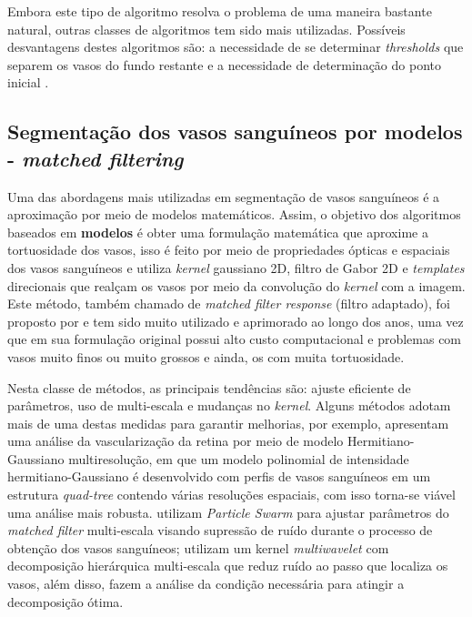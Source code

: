 Embora este tipo de algoritmo resolva o problema de uma maneira bastante natural, outras classes de algoritmos tem sido mais utilizadas. Possíveis desvantagens destes algoritmos são: a necessidade de se determinar \textit{thresholds} que separem os vasos do fundo restante e a necessidade de determinação do ponto inicial \cite{Wang2007}.


\subsection{Segmentação dos vasos sanguíneos por modelos - \textit{matched filtering}}


Uma das abordagens mais utilizadas em segmentação de vasos sanguíneos é a aproximação por meio de modelos matemáticos. Assim, o objetivo dos algoritmos baseados em \textbf{modelos} é obter uma formulação matemática que aproxime a tortuosidade dos vasos, isso é feito por meio de propriedades ópticas e espaciais dos vasos sanguíneos e utiliza \textit{kernel} gaussiano 2D, filtro de Gabor 2D e \textit{templates} direcionais que realçam os vasos por meio da convolução do \textit{kernel} com a imagem. Este método, também chamado de \textit{matched filter response} (filtro adaptado), foi proposto por  e tem sido muito utilizado e aprimorado ao longo dos anos, uma vez que em sua formulação original possui alto custo computacional e problemas com vasos muito finos ou muito grossos e ainda, os com muita tortuosidade. 

Nesta classe de métodos, as principais tendências são: ajuste eficiente de parâmetros, uso de multi-escala e mudanças no \textit{kernel}. Alguns métodos adotam mais de uma destas medidas para garantir melhorias, por exemplo,  apresentam uma análise da vascularização da retina por meio de modelo Hermitiano-Gaussiano multiresolução, em que um modelo polinomial de intensidade hermitiano-Gaussiano  é desenvolvido com perfis de  vasos sanguíneos em um estrutura \textit{quad-tree} contendo várias resoluções espaciais, com isso torna-se viável uma análise mais robusta.  utilizam \textit{Particle Swarm} para ajustar parâmetros do \textit{matched filter} multi-escala visando supressão de ruído durante o processo de obtenção dos vasos sanguíneos;   utilizam um kernel \textit{multiwavelet} com decomposição  hierárquica multi-escala que reduz ruído ao passo que localiza os vasos, além disso, fazem a análise da condição necessária para atingir a decomposição ótima.

